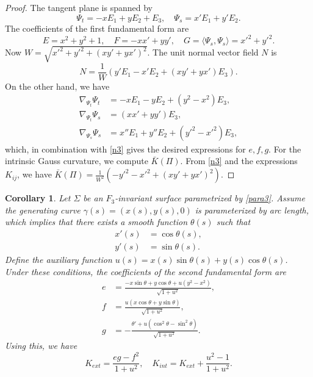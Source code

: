 \documentclass[a4paper,12pt]{amsart}
\theoremstyle{plain}
\newtheorem{corollary}[theorem]{Corollary}
\theoremstyle{definition}
\begin{document}
\begin{proof}
The tangent plane is spanned by 
$$\Psi_t = -x E_1 + y E_2 + E_3, \quad \Psi_s= x' E_1 + y' E_2.$$
The coefficients of the first fundamental form are
$$E = x^2 + y^2 + 1, \quad F = -xx' + yy', \quad 
G = \langle \Psi_s, \Psi_s \rangle = x'^2 + y'^2.$$
Now $W=\sqrt{ x'^2 + y'^2 + (xy' + yx')^2}$. The unit normal vector field $N$ is 
\begin{equation}\label{n3}
N = \frac{1}{W} \left( y' E_1 - x' E_2 +(xy' + yx') E_3 \right).
\end{equation}
On the other hand, we have
\begin{align*}
\nabla_{\Psi_t} \Psi_t &= -x E_1 - y E_2 + (y^2 - x^2) E_3, \\
\nabla_{\Psi_t} \Psi_s &= (xx' + yy') E_3, \\
\nabla_{\Psi_s} \Psi_s &= x'' E_1 + y'' E_2 + (y'^2 - x'^2) E_3,
\end{align*}
which, in combination with \eqref{n3} gives the desired expressions for $e, f, g$. For the intrinsic Gauss curvature, we compute $\bar{K}(\Pi)$. From \eqref{n3} and the expressions $K_{ij}$, we have $\bar{K}(\Pi) = \frac{1}{W^2} \left( -y'^2 - x'^2 + (xy' + yx')^2 \right)$. 


\end{proof}

\begin{corollary} \label{cor25} 
Let $\Sigma$ be an $F_3$-invariant surface parametrized by \eqref{para3}. Assume the generating curve $\gamma(s) = (x(s), y(s), 0)$ is parameterized by arc length, which implies that there exists a smooth function $\theta(s)$ such that 
\begin{equation}\label{3pp}
\begin{split}
x'(s) &= \cos\theta(s), \\
y'(s)& = \sin\theta(s).
\end{split}
\end{equation} 
 Define the auxiliary function $u(s) = x(s)\sin\theta(s) + y(s)\cos\theta(s)$. Under these conditions, the coefficients of the second fundamental form are
\begin{align*}
e &= \frac{-x\sin\theta +y\cos\theta + u(y^2 - x^2)}{\sqrt{1+u^2}}, \\
f &= \frac{u(x\cos\theta + y\sin\theta)}{\sqrt{1+u^2}}, \\
g &= -\frac{\theta' + u(\cos^2\theta - \sin^2\theta)}{\sqrt{1+u^2}}.
\end{align*}
Using this, we have
$$K_{ext} = \frac{eg - f^2}{1 + u^2}, \quad K_{int} = K_{ext} + \frac{u^2 - 1}{1 + u^2}.$$
\end{corollary}
 
\end{document}
